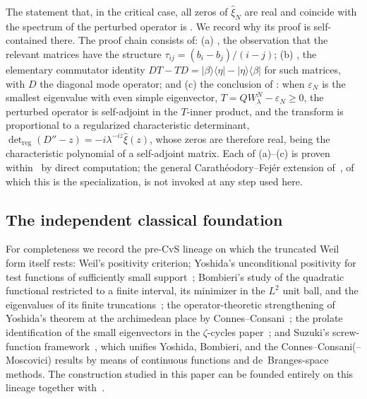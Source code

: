 \documentclass[11pt,a4paper]{article}
\begin{document}
The statement that, in the critical case, all zeros of $\widehat\xi_N$ are real
and coincide with the spectrum of the perturbed operator is
\cite[Thm.~5.10]{CCM2025}. We record why its proof is self-contained there.
The proof chain consists of: (a) \cite[Lem.~5.2]{CCM2025}, the observation that
the relevant matrices have the structure $\tau_{ij}=(b_i-b_j)/(i-j)$; (b)
\cite[Lem.~5.4]{CCM2025}, the elementary commutator identity
$DT-TD=|\beta\rangle\langle\eta|-|\eta\rangle\langle\beta|$ for such matrices,
with $D$ the diagonal mode operator; and (c) the conclusion of
\cite[Thm.~5.10]{CCM2025}: when $\varepsilon_N$ is the smallest eigenvalue with
even simple eigenvector, $T=QW^N_\lambda-\varepsilon_N\ge0$, the perturbed
operator is self-adjoint in the $T$-inner product, and the transform is
proportional to a regularized characteristic determinant,
$\det_{\mathrm{reg}}(D''-z)=-i\lambda^{-iz}\widehat\xi(z)$, whose zeros are
therefore real, being the characteristic polynomial of a self-adjoint matrix. Each
of (a)--(c) is proven within~\cite{CCM2025} by direct computation; the general
Carath\'eodory--Fej\'er extension of~\cite{CvS2025}, of which this is the
specialization, is not invoked at any step used here.

\subsection{The independent classical foundation}\label{app:foundation}

For completeness we record the pre-CvS lineage on which the truncated Weil
form itself rests: Weil's positivity criterion; Yoshida's unconditional
positivity for test functions of sufficiently small
support~\cite{Yoshida1992}; Bombieri's study of the quadratic functional
restricted to a finite interval, its minimizer in the $L^2$ unit ball, and the
eigenvalues of its finite truncations~\cite{Bombieri2000}; the
operator-theoretic strengthening of Yoshida's theorem at the archimedean place
by Connes--Consani~\cite{ConnesConsaniSelecta}; the prolate identification of
the small eigenvectors in the $\zeta$-cycles paper~\cite{ConnesConsaniZC}; and
Suzuki's screw-function framework~\cite{SuzukiJLMS,SuzukiHilbert,Suzuki2026},
which unifies Yoshida, Bombieri, and the Connes--Consani(--Moscovici) results
by means of continuous functions and de~Branges-space methods. The
construction studied in this paper can be founded entirely on this lineage
together with~\cite{CCM2025}.
\end{document}
